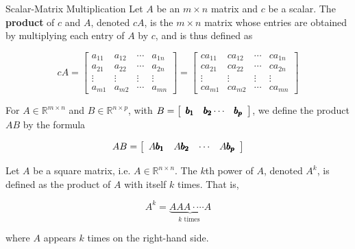 \begin{definition}{Scalar-Matrix Multiplication}
    Let $A$ be an $m \times n$ matrix and $c$ be a scalar. The \textbf{product} of $c$ and $A$, denoted $cA$, is the $m \times n$ matrix whose entries are obtained by multiplying each entry of $A$ by $c$, and is thus defined as

    $$
    c A=\left[\begin{array}{cccc}
    a_{11} & a_{12} & \cdots & a_{1 n} \\
    a_{21} & a_{22} & \cdots & a_{2 n} \\
    \vdots & \vdots & \vdots & \vdots \\
    a_{m 1} & a_{m 2} & \cdots & a_{m n}
    \end{array}\right] = \left[\begin{array}{cccc}
    c a_{11} & c a_{12} & \cdots & c a_{1 n} \\
    c a_{21} & c a_{22} & \cdots & c a_{2 n} \\
    \vdots & \vdots & \vdots & \vdots \\
    c a_{m 1} & c a_{m 2} & \cdots & c a_{m n}
    \end{array}\right]
    $$
    
\end{definition}

\begin{definition}
    For $A \in \mathbb{R}^{m \times n}$ and $B \in \mathbb{R}^{n \times p}$, with $B=\left[\begin{array}{lll}\pmb{b_1} & \pmb{b_2} \cdots & \pmb{b_p}\end{array}\right]$, we define the product $A B$ by the formula

\[
A B=\left[\begin{array}{llll}
A \pmb{b_1} & A \pmb{b_2} & \cdots & A \pmb{b_p}
\end{array}\right]
\]

\end{definition}

\begin{definition}
    Let $A$ be a square matrix, i.e. $ A \in \mathbb{R}^{n \times n}$. The $k$th power of $A$, denoted $A^k$, is defined as the product of $A$ with itself $k$ times. That is,

    $$
    A^k=\underbrace{ AAA \cdot \cdots A}_{k \text { times }}
    $$

    where $A$ appears $k$ times on the right-hand side.
\end{definition}

